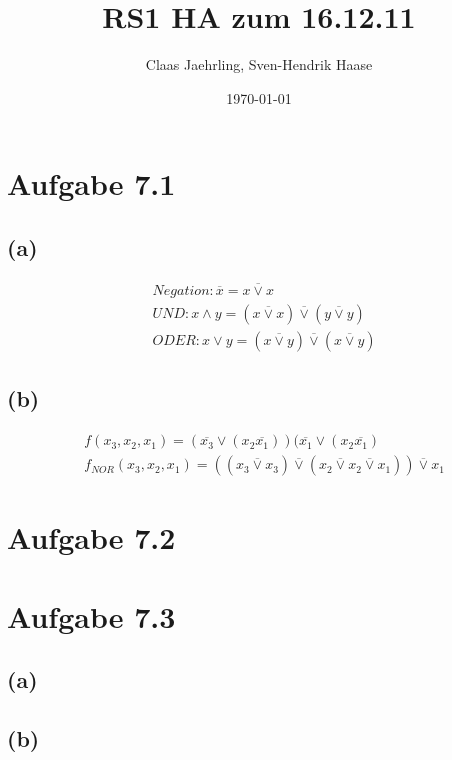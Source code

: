 \documentclass[12pt]{article}
\author{Claas Jaehrling, Sven-Hendrik Haase}
\title{RS1 HA zum 16.12.11}
\date{\today}
\begin{document}
\setcounter{secnumdepth}{0}
\maketitle

\section{Aufgabe 7.1}
\subsection{(a)}
\begin{align}
&Negation: \overline x = x \overline \lor x\\
&UND: x \land y = (x \overline \lor x) \overline \lor (y \overline \lor y)\\
&ODER: x \lor y = (x \overline \lor y) \overline \lor (x \overline \lor y)
\end{align}
\subsection{(b)}
\begin{align}
&f(x_3,x_2,x_1) = (\overline {x_3} \lor (x_2 \overline {x_1}))
(\overline {x_1} \lor (x_2 \overline {x_1})\\
&f_{NOR}(x_3,x_2,x_1) = ((x_3 \overline \lor x_3) \overline \lor 
(x_2 \overline \lor x_2 \overline \lor x_1)) \overline \lor x_1
\end{align}

\section{Aufgabe 7.2}


\section{Aufgabe 7.3}
\subsection{(a)}

\subsection{(b)}
\end{document}
